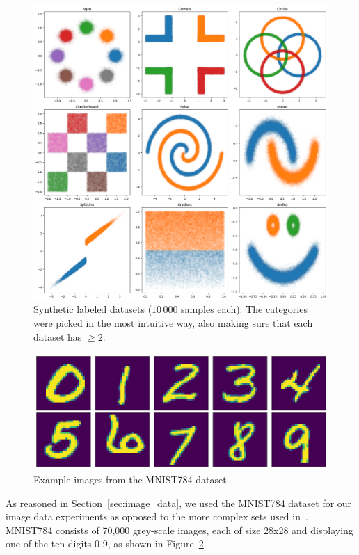 \begin{figure}
\centering
\includegraphics[width=\textwidth]{images/synthetic/overview/synt-lab.png}
\caption{Synthetic labeled datasets ($10\,000$ samples each). The categories were picked in the most intuitive way, also making sure that each dataset has $ \geq 2$.}\label{fig:synt-lab}
\end{figure}

\begin{figure}
\centering
\includegraphics[width=\textwidth]{images/mnist_maxpooling/mnist_dataset.png}
\caption{Example images from the MNIST784 dataset.}
\label{fig:mnist784_example}
\end{figure}


As reasoned in Section~\ref{sec:image_data}, we used the MNIST784 dataset for our image data experiments as opposed to the more complex sets used in~\cite{nielsen2020survae}. MNIST784 consists of 70,000 grey-scale images, each of size 28x28 and displaying one of the ten digits 0-9, as shown in Figure~\ref{fig:mnist784_example}.


